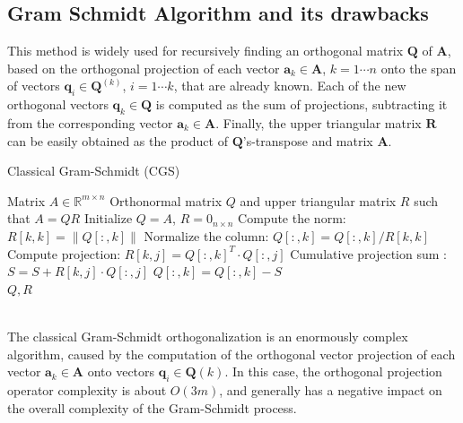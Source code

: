 \documentclass[12pt]{article}
\begin{document}
	\subsection{Gram Schmidt Algorithm and its drawbacks}
	This method is widely used for recursively finding an orthogonal matrix \( \mathbf{Q} \) of \( \mathbf{A} \), based on the orthogonal projection of each vector \( \mathbf{a}_k \in \mathbf{A} \), \( k=1\cdots n \) onto the span of vectors \( \mathbf{q}_i \in \mathbf{Q}^{(k)} \), \( i=1\cdots k \), that are already known. Each of the new orthogonal vectors \( \mathbf{q}_k \in \mathbf{Q} \) is computed as the sum of projections, subtracting it from the corresponding vector \( \mathbf{a}_k \in \mathbf{A} \). Finally, the upper triangular matrix \( \mathbf{R} \) can be easily obtained as the product of \( \mathbf{Q} \)'s-transpose and matrix \( \mathbf{A} \). 
	\begin{algorithm}
		\caption{Classical Gram-Schmidt (CGS)}
		\begin{algorithmic}[1]
			\Require Matrix \( A \in \mathbb{R}^{m \times n} \)
			\Ensure Orthonormal matrix \( Q \) and upper triangular matrix \( R \) such that \( A = QR \)
			\State Initialize \( Q = A \), \( R = 0_{n \times n} \)
			\State Compute the norm: \( R[k,k] = \|Q[:,k]\| \)
			\State Normalize the column: \( Q[:,k] = Q[:,k] / R[k,k] \)
			\State Compute projection: \( R[k,j] = Q[:,k]^T \cdot Q[:,j] \)
			\State	Cumulative projection sum : \( S = S + R[k,j] \cdot Q[:,j] \)
			\EndFor
			\State $Q[:,k] = Q[:,k] - S$
			\EndFor \\
			\Return \( Q, R \)
		\end{algorithmic}
	\end{algorithm}\\
	The classical Gram-Schmidt orthogonalization is an enormously complex algorithm, caused by the computation of the orthogonal vector projection of each vector \( \mathbf{a}_k \in \mathbf{A} \) onto vectors \( \mathbf{q}_i \in \mathbf{Q}(k) \). In this case, the orthogonal projection operator complexity is about \( O(3m) \), and generally has a negative impact on the overall complexity of the Gram-Schmidt process. 
	
\end{document}

